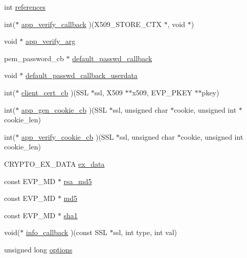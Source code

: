 \begin{DoxyCompactItemize}
\begin{tabbing}
\end{tabbing}\item 
int \hyperlink{structssl__ctx__st_aaefa58bdf5771d0ae34e05dbc372f6c3}{references}
\item 
int($\ast$ \hyperlink{structssl__ctx__st_a1f66a04c28f7896e13eb1fe8aa0f388e}{app\-\_\-verify\-\_\-callback} )(X509\-\_\-\-S\-T\-O\-R\-E\-\_\-\-C\-T\-X $\ast$, void $\ast$)
\item 
void $\ast$ \hyperlink{structssl__ctx__st_ac65736129c311f93009b7f3d67b95bcf}{app\-\_\-verify\-\_\-arg}
\item 
pem\-\_\-password\-\_\-cb $\ast$ \hyperlink{structssl__ctx__st_a8065ec3c28e4a61ff8041119cc029aa2}{default\-\_\-passwd\-\_\-callback}
\item 
void $\ast$ \hyperlink{structssl__ctx__st_a66ba3cb88f01250883fd336791b354b2}{default\-\_\-passwd\-\_\-callback\-\_\-userdata}
\item 
int($\ast$ \hyperlink{structssl__ctx__st_abb1883d320a908f6919b80e350d6c4f2}{client\-\_\-cert\-\_\-cb} )(S\-S\-L $\ast$ssl, X509 $\ast$$\ast$x509, E\-V\-P\-\_\-\-P\-K\-E\-Y $\ast$$\ast$pkey)
\item 
int($\ast$ \hyperlink{structssl__ctx__st_a96ce9710410a943020c5fd45378ec539}{app\-\_\-gen\-\_\-cookie\-\_\-cb} )(S\-S\-L $\ast$ssl, unsigned char $\ast$cookie, unsigned int $\ast$cookie\-\_\-len)
\item 
int($\ast$ \hyperlink{structssl__ctx__st_a1db4843c271681af790f0eadf15c46d3}{app\-\_\-verify\-\_\-cookie\-\_\-cb} )(S\-S\-L $\ast$ssl, unsigned char $\ast$cookie, unsigned int cookie\-\_\-len)
\item 
C\-R\-Y\-P\-T\-O\-\_\-\-E\-X\-\_\-\-D\-A\-T\-A \hyperlink{structssl__ctx__st_a5deb70881c01f2e35ea2fa46c37ba21e}{ex\-\_\-data}
\item 
const E\-V\-P\-\_\-\-M\-D $\ast$ \hyperlink{structssl__ctx__st_a297d3bf2019076959d84c41a41e7ac3b}{rsa\-\_\-md5}
\item 
const E\-V\-P\-\_\-\-M\-D $\ast$ \hyperlink{structssl__ctx__st_a0d2c62fc7903597eef4c4890ba327a16}{md5}
\item 
const E\-V\-P\-\_\-\-M\-D $\ast$ \hyperlink{structssl__ctx__st_ae6ea4c79f3be1d3c103b290e08009204}{sha1}
\item 
void($\ast$ \hyperlink{structssl__ctx__st_a35ffccaa233ba0815d6c034e3fbb43ef}{info\-\_\-callback} )(const S\-S\-L $\ast$ssl, int type, int val)
\item 
unsigned long \hyperlink{structssl__ctx__st_aeca7f42401b9a9465d47a206f155f6ba}{options}
\item 

\end{DoxyCompactItemize}
